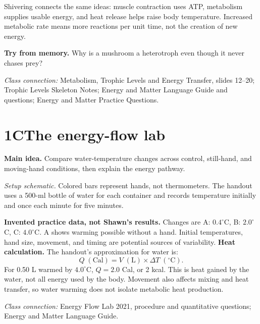 \documentclass[11pt,letterpaper]{article}
\newcommand{\pagechapter}[2]{\clearpage\section*{#1}\phantomsection\label{#2}\addcontentsline{toc}{section}{#1}}
\newcommand{\idea}[1]{\textbf{Main idea.} #1\par}
\newcommand{\memorycheck}[1]{\par\smallskip\textbf{Try from memory.} #1\par}
\newcommand{\classsource}[1]{{\footnotesize\textit{Class connection:} #1\par}}
\begin{document}
Shivering connects the same ideas: muscle contraction uses ATP, metabolism supplies usable energy, and heat release helps raise body temperature. Increased metabolic rate means more reactions per unit time, not the creation of new energy.
\memorycheck{Why is a mushroom a heterotroph even though it never chases prey?}
\classsource{Metabolism, Trophic Levels and Energy Transfer, slides 12--20; Trophic Levels Skeleton Notes; Energy and Matter Language Guide and questions; Energy and Matter Practice Questions.}

\pagechapter{1C\quad The energy-flow lab}{lab}
\idea{Compare water-temperature changes across control, still-hand, and moving-hand conditions, then explain the energy pathway.}
\begin{center}
\par
\end{center}
\textit{Setup schematic.} Colored bars represent hands, not thermometers. The handout uses a 500-ml bottle of water for each container and records temperature initially and once each minute for five minutes.
\begin{center}
\par
\end{center}
\textbf{Invented practice data, not Shawn's results.} Changes are A: $0.4^\circ$C, B: $2.0^\circ$C, C: $4.0^\circ$C. A shows warming possible without a hand. Initial temperatures, hand size, movement, and timing are potential sources of variability.
\textbf{Heat calculation.} The handout's approximation for water is:
\[
Q\;(\mathrm{Cal})=V\;(\mathrm{L})\times\Delta T\;({}^\circ\mathrm C).
\]
For 0.50 L warmed by $4.0^\circ$C, $Q=2.0$ Cal, or 2 kcal. This is heat gained by the water, not all energy used by the body. Movement also affects mixing and heat transfer, so water warming does not isolate metabolic heat production.
\classsource{Energy Flow Lab 2021, procedure and quantitative questions; Energy and Matter Language Guide.}
\end{document}
